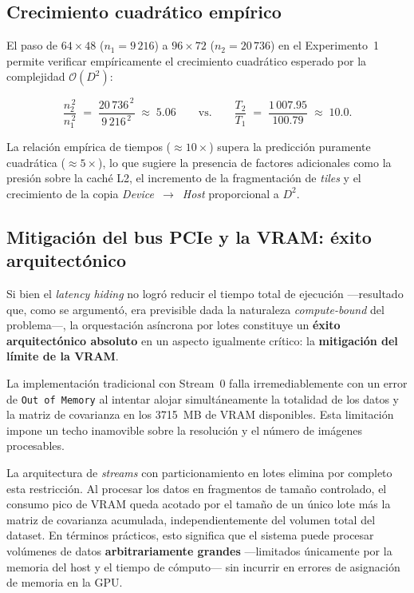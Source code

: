 \documentclass[12pt, a4paper]{article}
\begin{document}
\subsection{Crecimiento cuadrático empírico}

El paso de $64 \times 48$ ($n_1 = 9\,216$) a $96 \times 72$
($n_2 = 20\,736$) en el Experimento~1 permite verificar empíricamente el
crecimiento cuadrático esperado por la complejidad $\mathcal{O}(D^2)$:

\begin{equation}
    \frac{n_2^{\,2}}{n_1^{\,2}} \;=\;
    \frac{20\,736^{\,2}}{9\,216^{\,2}} \;\approx\; 5.06
    \qquad\text{vs.}\qquad
    \frac{T_2}{T_1} \;=\;
    \frac{1\,007.95}{100.79} \;\approx\; 10.0.
\end{equation}

La relación empírica de tiempos ($\approx 10{\times}$) supera la predicción
puramente cuadrática ($\approx 5{\times}$), lo que sugiere la presencia de
factores adicionales como la presión sobre la caché L2, el incremento de la
fragmentación de \textit{tiles} y el crecimiento de la copia
\textit{Device}~$\to$~\textit{Host} proporcional a $D^2$.

\subsection{Mitigación del bus PCIe y la VRAM: éxito arquitectónico}

Si bien el \textit{latency hiding} no logró reducir el tiempo total de
ejecución ---resultado que, como se argumentó, era previsible dada la
naturaleza \textit{compute-bound} del problema---, la orquestación asíncrona
por lotes constituye un \textbf{éxito arquitectónico absoluto} en un aspecto
igualmente crítico: la \textbf{mitigación del límite de la VRAM}.

La implementación tradicional con Stream~0 falla irremediablemente con un
error de \texttt{Out of Memory} al intentar alojar simultáneamente la totalidad
de los datos y la matriz de covarianza en los 3715~MB de VRAM disponibles.
Esta limitación impone un techo inamovible sobre la resolución y el número de
imágenes procesables.

La arquitectura de \textit{streams} con particionamiento en lotes elimina por
completo esta restricción. Al procesar los datos en fragmentos de tamaño
controlado, el consumo pico de VRAM queda acotado por el tamaño de un único
lote más la matriz de covarianza acumulada, independientemente del volumen
total del dataset. En términos prácticos, esto significa que el sistema puede
procesar volúmenes de datos \textbf{arbitrariamente grandes} ---limitados
únicamente por la memoria del host y el tiempo de cómputo--- sin incurrir en
errores de asignación de memoria en la GPU.
\end{document}

